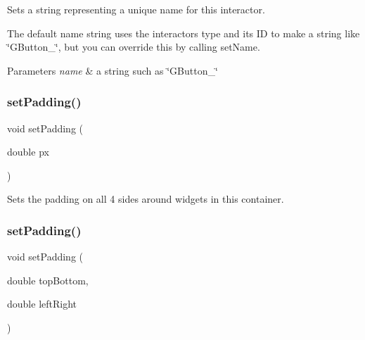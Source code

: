 Sets a string representing a unique name for this interactor. 

The default name string uses the interactor\textquotesingle{}s type and its ID to make a string like \char`\"{}\+G\+Button\+\_\char`\"{}, but you can override this by calling set\+Name. 
\begin{DoxyParams}{Parameters}
{\em name} & a string such as \char`\"{}\+G\+Button\+\_\char`\"{} \\
\hline
\end{DoxyParams}
\mbox{\label{classGContainer_a81b293e913c083a544af96f031668225}} 
\subsubsection{\texorpdfstring{set\+Padding()}{setPadding()}\hspace{0.1cm}{\footnotesize\ttfamily [1/3]}}
{\footnotesize\ttfamily void set\+Padding (\begin{DoxyParamCaption}\item[{double}]{px }\end{DoxyParamCaption})\hspace{0.3cm}{\ttfamily [virtual]}}



Sets the padding on all 4 sides around widgets in this container. 

\mbox{\label{classGContainer_a76dc599dd8828f0ab534ab0d1b0c5ef8}} 
\subsubsection{\texorpdfstring{set\+Padding()}{setPadding()}\hspace{0.1cm}{\footnotesize\ttfamily [2/3]}}
{\footnotesize\ttfamily void set\+Padding (\begin{DoxyParamCaption}\item[{double}]{top\+Bottom,  }\item[{double}]{left\+Right }\end{DoxyParamCaption})\hspace{0.3cm}{\ttfamily [virtual]}}



